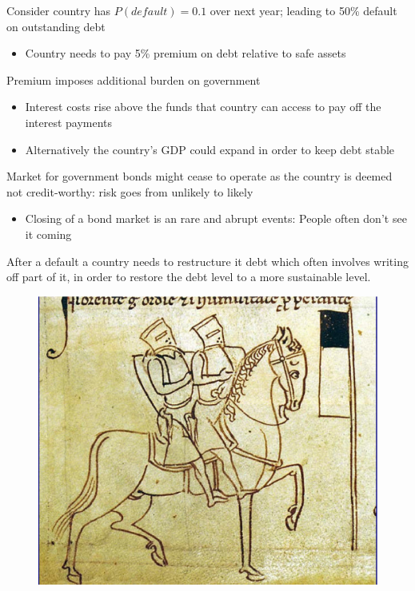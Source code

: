 \documentclass{beamer}
\begin{document}
\begin{frame}
  Consider country has $P(default)=0.1$ over next year; leading to 50\% default on outstanding debt
  \begin{itemize}
    \item Country needs to pay 5\% premium on debt relative to safe assets
  \end{itemize}
  \medskip
  Premium imposes additional burden on government
  \begin{itemize}
    \item Interest costs rise above the funds that country can access to pay off the interest payments
    \item Alternatively the country's GDP could expand in order to keep debt stable
  \end{itemize}
  Market for government bonds might cease to operate as the country is deemed not credit-worthy: risk goes from unlikely to likely
  \begin{itemize}
    \item Closing of a bond market is an rare and abrupt events: People often don't see it coming
  \end{itemize}
  After a default a country needs to restructure it debt which often involves writing off part of it, in order to restore the debt level to a more sustainable level. 
\end{frame}

\begin{frame}
  \begin{figure}
    \includegraphics{templars.eps}
  \end{figure}
\end{frame}
\end{document}
